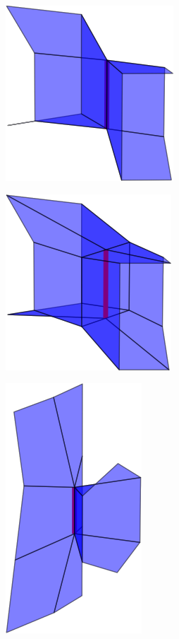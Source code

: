 \begin{figure}
\begin{center}
\begin{subfigure}[b]{.45\textwidth}
\centering
\includegraphics[height = .17\textheight, width = .5\textwidth,keepaspectratio]{Pictures/SurfaceReconstruction/3DManifoldOO}
\end{subfigure}
\begin{subfigure}[b]{.45\textwidth}
\centering
\includegraphics[height = .17\textheight, width = .5\textwidth,keepaspectratio]{Pictures/SurfaceReconstruction/3DManifoldOORes}
\end{subfigure}
\begin{subfigure}[b]{.45\textwidth}
\centering
\includegraphics[height = .17\textheight, width = .5\textwidth,keepaspectratio]{Pictures/SurfaceReconstruction/3DManifoldII}

\end{subfigure}
\end{center}
\end{figure}
